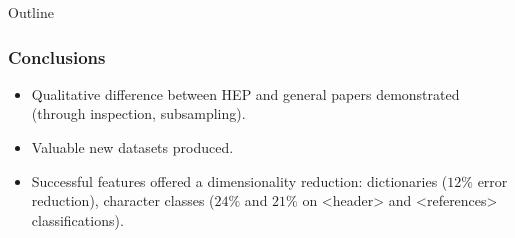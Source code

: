 \documentclass{beamer}
\begin{document}

\begin{frame}[noframenumbering]{Outline}
\end{frame}


\begin{frame}
\frametitle{Conclusions}
\begin{itemize}
\item Qualitative difference between HEP and general papers demonstrated (through inspection, subsampling).
\item Valuable new datasets produced.
\item Successful features offered a dimensionality reduction: dictionaries ($12\%$ error reduction), character classes ($24\%$ and $21\%$ on <header> and <references> classifications).
\end{itemize}
\end{frame}


\end{document}
